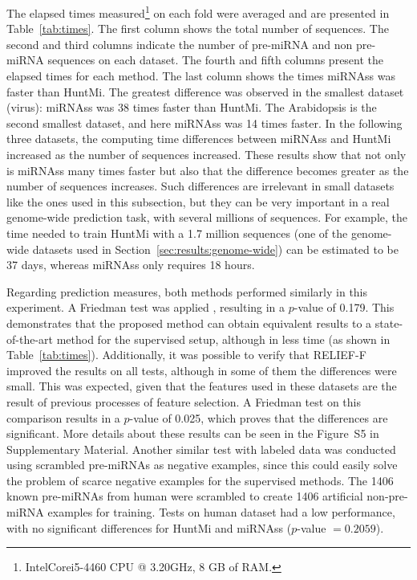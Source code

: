 \documentclass{article}
\begin{document}
The elapsed times measured\footnote{Intel\textregistered Core\texttrademark i5-4460 CPU @ 3.20GHz, 8 GB of RAM.} on each fold were averaged and are presented in Table~\ref{tab:times}. The first column shows the total number of sequences. The second and third columns indicate the number of pre-miRNA and non pre-miRNA sequences on each dataset. The fourth and fifth columns present the elapsed times for each method. The last column shows the times miRNAss was faster than HuntMi. The greatest difference was observed in the smallest dataset (virus): miRNAss was 38 times faster than HuntMi. The Arabidopsis is the second smallest dataset, and here miRNAss was 14 times faster. In the following three datasets, the computing time differences between miRNAss and HuntMi increased as the number of sequences increased. These results show that not only is miRNAss many times faster but also that the difference becomes greater as the number of sequences increases. Such differences are irrelevant in small datasets like the ones used in this subsection, but they can be very important in a real genome-wide prediction task, with several millions of sequences. For example, the time needed to train HuntMi with a 1.7 million sequences (one of the genome-wide datasets used in Section~\ref{sec:results:genome-wide}) can be estimated to be 37 days, whereas miRNAss only requires 18 hours.

Regarding prediction measures, both methods performed similarly in this experiment. A Friedman test was applied \citep{friedman1937use}, resulting in a $p$-value of 0.179. This demonstrates that the proposed method can obtain equivalent results to a state-of-the-art method for the supervised setup, although in less time (as shown in Table~\ref{tab:times}). 
Additionally, it was possible to verify that RELIEF-F improved the results on all tests, although in some of them the differences were small. This was expected, given that the features used in these datasets are the result of previous processes of feature selection. A Friedman test on this comparison results in a $p$-value of 0.025, which proves that the differences are significant. More details about these results can be seen in the Figure~S5 in Supplementary Material.
Another similar test with labeled data was conducted using scrambled pre-miRNAs as negative examples, since this could easily solve the problem of scarce negative examples for the supervised methods. The 1406 known pre-miRNAs from human were scrambled to create 1406 artificial non-pre-miRNA examples for training. Tests on human dataset had a low performance, with no significant differences for HuntMi and miRNAss ($p$-value $= 0.2059$).
\end{document}
